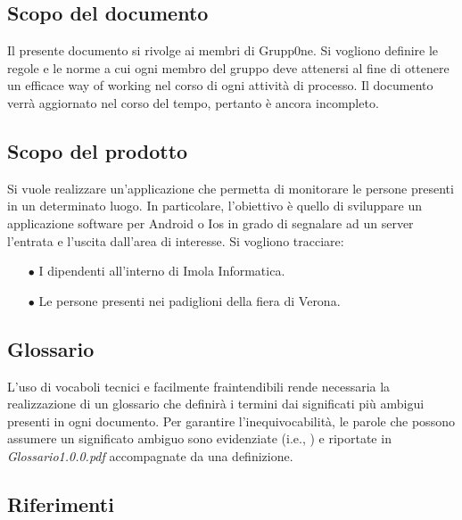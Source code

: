 \documentclass[../norme-di-progetto.tex]{subfiles}
\begin{document}
\subsection{Scopo del documento}
\label{sub:scopo del documento}
Il presente documento si rivolge ai membri di Grupp0ne. Si vogliono definire le regole e le norme a cui ogni membro del gruppo deve attenersi al fine di ottenere un efficace way of working nel corso di ogni attività di processo. Il documento verrà aggiornato nel corso del tempo, pertanto è ancora incompleto. 


\subsection{Scopo del prodotto}
\label{sub:scopo del prodotto}
Si vuole realizzare un'applicazione che permetta di monitorare le persone presenti in un determinato luogo. In particolare, l'obiettivo è quello di sviluppare un applicazione software per Android o Ios in grado di segnalare ad un server l'entrata e l'uscita dall'area di interesse.
Si vogliono tracciare:
\begin{itemize}
	\item[$\bullet$]  I dipendenti all'interno di Imola Informatica.
	\item[$\bullet$] Le persone presenti nei padiglioni della fiera di Verona.
\end{itemize}

\subsection{Glossario}
\label{sub:glossario}
L'uso di vocaboli tecnici e facilmente fraintendibili rende necessaria la realizzazione di un glossario che definirà i termini dai significati più ambigui presenti in ogni documento. Per garantire l'inequivocabilità, le parole che possono assumere un significato ambiguo sono evidenziate (i.e., ) e riportate in \textit{Glossario1.0.0.pdf} accompagnate da una definizione.

\subsection{Riferimenti}
\label{sub:riferimenti}
\end{document}
